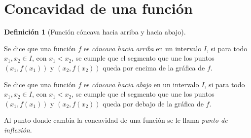 \documentclass[
  a4paper,
]{scrreport}
\theoremstyle{definition}
\theoremstyle{plain}
\theoremstyle{definition}
\newtheorem{definition}{Definición}[chapter]
\theoremstyle{definition}
\theoremstyle{plain}
\theoremstyle{plain}
\theoremstyle{remark}
\begin{document}
\section{Concavidad de una función}\label{concavidad-de-una-funciuxf3n}

\begin{definition}[Función cóncava hacia arriba y hacia
abajo]\protect\hypertarget{def-concavidad-funcion}{}\label{def-concavidad-funcion}

Se dice que una función \(f\) es \emph{cóncava hacia arriba} en un
intervalo \(I\), si para todo \(x_1,x_2\in I\), con \(x_1<x_2\), se
cumple que el segmento que une los puntos \((x_1,f(x_1))\) y
\((x_2,f(x_2))\) queda por encima de la gráfica de \(f\).

Se dice que una función \(f\) es \emph{cóncava hacia abajo} en un
intervalo \(I\), si para todo \(x_1,x_2\in I\), con \(x_1<x_2\), se
cumple que el segmento que une los puntos \((x_1,f(x_1))\) y
\((x_2,f(x_2))\) queda por debajo de la gráfica de \(f\).

Al punto donde cambia la concavidad de una función se le llama
\emph{punto de inflexión}.

\end{definition}
\end{document}
